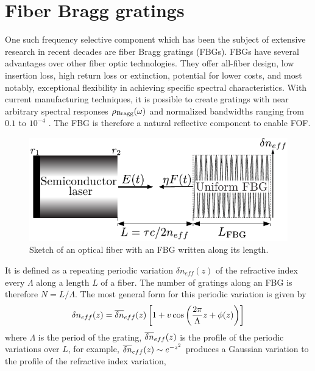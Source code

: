 \section*{Fiber Bragg gratings}
\label{sec:FBG}
%
One such frequency selective component which has been the subject of extensive research in recent decades are fiber Bragg gratings (FBGs). 
FBGs have several advantages over other fiber optic technologies. 
They offer all-fiber design, low insertion loss, high return loss or extinction,  potential for lower costs, and most notably, exceptional flexibility in achieving specific spectral characteristics. 
With current manufacturing techniques, it is possible to create gratings with near arbitrary spectral responses $\rho_\text{Bragg}(\omega)$ and normalized bandwidths ranging from $0.1$ to $10^{-4}$ \cite{erdogan1997fiber}. 
The FBG is therefore a natural reflective component to enable FOF.
%
\begin{figure}
    \centering 

    \includegraphics[width=\linewidth]{Images/FBG_setup_dneff_only_1col.pdf}

    \caption{Sketch of an optical fiber with an FBG written along its length.}

    \label{fig:FBG_setup}

\end{figure}
%
\par
%
It is defined as a repeating periodic variation $\delta n_{eff}(z)$ of the refractive index every $\Lambda$ along a length $L$ of a fiber. 
The number of gratings along an FBG is therefore $N = L/\Lambda$. The most general form for this periodic variation is given by
%
\begin{equation}
\label{eq:dneff}
    \delta n_{eff}(z) = \overline{\delta n}_{eff}(z) \left[ 1 + v \cos{\left( \frac{2 \pi}{\Lambda} z + \phi(z) \right)} \right]
\end{equation}
%
where $\Lambda$ is the period of the grating, $\overline{\delta n}_{eff}(z)$ is the profile of the periodic variations over $L$, for example, $\overline{\delta n}_{eff}(z) \sim e^{-z^2}$ produces a Gaussian variation to the profile of the refractive index variation, 
